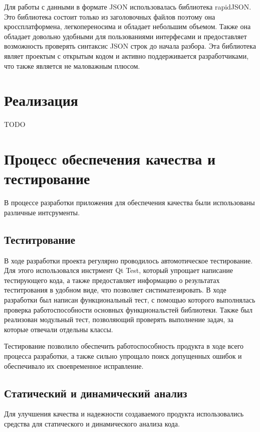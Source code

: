 Для работы с данными в формате JSON использовалась библиотека rapidJSON. Это библиотека состоит только из заголовочных файлов поэтому она кроссплатформена, легкопереносима и обладает небольшим объемом. Также она обладает довольно удобными для пользованиями интерфесами и предоставляет возможность проверять синтаксис JSON строк до начала разбора. Эта библиотека являет проектым с открытым кодом и активно поддерживается разработчиками, что также является не маловажным плюсом.

\section{Реализация}

TODO

\section{Процесс обеспечения качества и тестирование}

В процессе разработки приложения для обеспечения качества были использованы различные интсрументы.

\subsection{Теститрование}

В ходе разработки проекта регулярно проводилось автомотическое тестирование. Для этого использовался инстрмент Qt Test, который упрощает написание тестирующего кода, а также предоставляет информацию о результатах теститрования в удобном виде, что позволяет систиматезировать. В ходе разработки был написан функциональный тест, с помощью которого выполнялась проверка работоспособности основных функциональстей библиотеки. Также был реализован модульный тест, позволяющий проверять выполнение задач, за которые отвечали отдельны классы.

Тестирование позволило обеспечить работоспособность продукта в ходе всего процесса разработки, а также сильно упрощало поиск допущенных ошибок и обеспечивало их своевременное исправление.   

\subsection{Статический и динамический анализ}

Для улучшения качества и надежности создаваемого продукта использовались средства для статического и динамического анализа кода.

